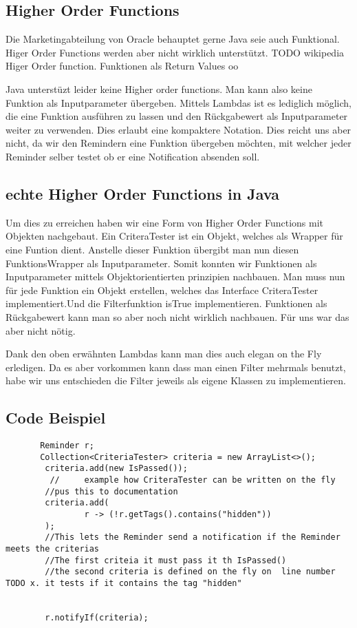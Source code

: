 \subsection{ Higher Order Functions}
  Die Marketingabteilung von Oracle behauptet gerne Java seie auch Funktional. Higer Order Functions werden aber nicht wirklich unterstützt. 
  TODO wikipedia Higer Order function. 
  Funktionen als Return Values oo
  
  Java unterstüzt leider keine Higher order functions. Man kann also keine Funktion als Inputparameter übergeben.
  Mittels Lambdas ist es lediglich möglich, die eine Funktion ausführen zu lassen und den Rückgabewert als Inputparameter weiter zu verwenden. Dies erlaubt eine kompaktere Notation. Dies reicht uns aber nicht, da wir den Remindern eine Funktion übergeben möchten, mit welcher jeder Reminder selber testet ob er eine Notification absenden soll. 
  
  \subsection{echte Higher Order Functions in Java}
  Um dies zu erreichen haben wir eine Form von Higher Order Functions mit Objekten nachgebaut. 
  Ein CriteraTester ist ein Objekt, welches als Wrapper für eine Funtion dient. Anstelle dieser Funktion übergibt man nun diesen FunktionsWrapper als Inputparameter. Somit konnten wir Funktionen als Inputparameter mittels Objektorientierten prinzipien nachbauen.
  Man muss nun für jede Funktion ein Objekt erstellen, welches das Interface CriteraTester implementiert.Und die Filterfunktion isTrue implementieren.
  Funktionen als Rückgabewert kann man so aber noch nicht wirklich nachbauen. Für uns war das aber nicht nötig.
  
  Dank den oben erwähnten Lambdas kann man dies auch elegan on the Fly erledigen. Da es aber vorkommen kann dass man einen Filter mehrmals benutzt, habe wir uns entschieden die Filter jeweils als eigene Klassen zu implementieren.
  \subsection{Code Beispiel}
  
       \begin{lstlisting}
       Reminder r;
       Collection<CriteriaTester> criteria = new ArrayList<>();
        criteria.add(new IsPassed());
         //     example how CriteraTester can be written on the fly
        //pus this to documentation
        criteria.add(
                r -> (!r.getTags().contains("hidden"))
        );
        //This lets the Reminder send a notification if the Reminder meets the criterias 
        //The first criteia it must pass it th IsPassed()
        //the second criteria is defined on the fly on  line number TODO x. it tests if it contains the tag "hidden"
        
     
        r.notifyIf(criteria);

       \end{lstlisting}